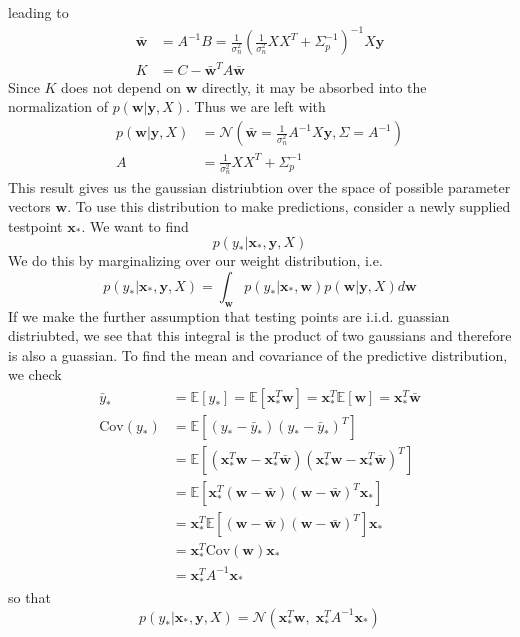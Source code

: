     leading to 
    \begin{align}
    \bar{\mathbf{w}} &= A^{-1}B = \frac{1}{\sigma_n^2}\left(\frac{1}{\sigma_n^2}XX^T + \Sigma_p^{-1}\right)^{-1}X\mathbf{y} \\
    K &= C- \bar{\mathbf{w}}^TA\bar{\mathbf{w}}
\end{align}
Since $K$ does not depend on $\mathbf{w}$ directly, it may be absorbed into the normalization of $p(\mathbf{w}\vert \mathbf{y}, X)$. Thus we are left with
\begin{align}
    p(\mathbf{w}\vert\mathbf{y},X) &= \mathcal{N}\left( \bar{\mathbf{w}}=\frac{1}{\sigma_n^2}A^{-1}X\mathbf{y}, \Sigma=A^{-1}\right) \\
    A &= \frac{1}{\sigma_n^2}XX^T+\Sigma_p^{-1}
\end{align}
This result gives us the gaussian distriubtion over the space of possible parameter vectors $\mathbf{w}$. To use this distribution to make predictions, consider a newly supplied testpoint $\mathbf{x}_*$. We want to find
\begin{equation}
    p(y_* \vert \mathbf{x}_*, \mathbf{y}, X)
\end{equation}
We do this by marginalizing over our weight distribution, i.e.
\begin{equation}
    p(y_* \vert \mathbf{x}_*, \mathbf{y}, X) = \int_{\mathbf{w}} p(y_*\vert \mathbf{x}_*,\mathbf{w})p(\mathbf{w}\vert \mathbf{y}, X)d\mathbf{w}
\end{equation}
If we make the further assumption that testing points are i.i.d. guassian distriubted, we see that this integral is the product of two gaussians and therefore is also a guassian. To find the mean and covariance of the predictive distribution, we check
\begin{align} 
    \bar{y}_* &= \mathbb{E}[y_*] = \mathbb{E}[\mathbf{x}_*^T\mathbf{w}] = \mathbf{x}_*^T\mathbb{E}[\mathbf{w}] = \mathbf{x}_*^T\bar{\mathbf{w}} \\
    \text{Cov}(y_*) &= \mathbb{E}[(y_*-\bar{y}_*)(y_*-\bar{y}_*)^T] \\
    &= \mathbb{E}[(\mathbf{x}_*^T\mathbf{w}-\mathbf{x}_*^T\bar{\mathbf{w}})(\mathbf{x}_*^T\mathbf{w}-\mathbf{x}_*^T\bar{\mathbf{w}})^T] \\
    &= \mathbb{E}[\mathbf{x}_*^T(\mathbf{w}-\bar{\mathbf{w}})(\mathbf{w}-\bar{\mathbf{w}})^T\mathbf{x}_*] \\
    &= \mathbf{x}_*^T\mathbb{E}[(\mathbf{w}-\bar{\mathbf{w}})(\mathbf{w}-\bar{\mathbf{w}})^T]\mathbf{x}_* \\
    &= \mathbf{x}_*^T\text{Cov}(\mathbf{w})\mathbf{x}_* \\
    &= \mathbf{x}_*^TA^{-1}\mathbf{x}_*
\end{align}
so that
\begin{equation}
    \boxed{p(y_* \vert \mathbf{x}_*, \mathbf{y}, X) = \mathcal{N}\left(\mathbf{x}_*^T\mathbf{w},\;  \mathbf{x}_*^TA^{-1}\mathbf{x}_*\right)}
\end{equation}


